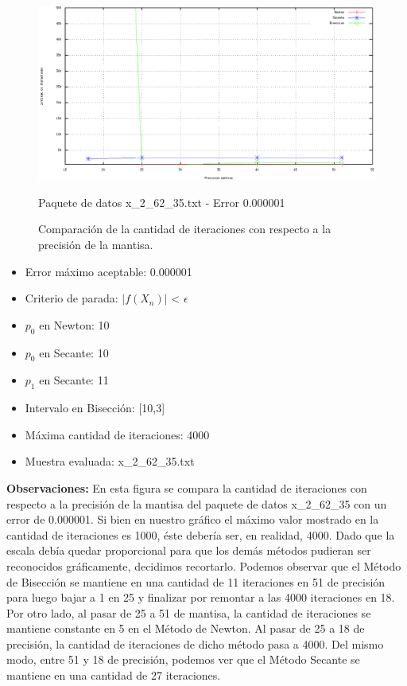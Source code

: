 \documentclass[10pt, a4paper]{article}
\begin{document}
\begin{figure}[H] %
\begin{center}
\includegraphics[width=370pt]{./cantidaditeraciones_mantisaerror.png}
\caption[h]{Comparaci\'on de la cantidad de iteraciones con respecto a la precisi\'on de la mantisa.}{Paquete de datos x\_2\_62\_35.txt - Error 0.000001}
\end{center}
\end{figure}

\begin{itemize}
\item Error m\'aximo aceptable: 0.000001
\item Criterio de parada: $|f(X_{n})|$ < $\epsilon$ 
\item $p_{0}$ en Newton: 10
\item $p_{0}$ en Secante: 10
\item $p_{1}$ en Secante: 11
\item Intervalo en Bisecci\'on: [10,3]
\item M\'axima cantidad de iteraciones: 4000
\item Muestra evaluada: x\_2\_62\_35.txt
\end{itemize}

\large{\textbf{Observaciones:}}
En esta figura se compara la cantidad de iteraciones con respecto a la precisi\'on de la mantisa del paquete de datos x\_2\_62\_35 con un error de 0.000001.\newline
Si bien en nuestro gr\'afico el m\'aximo valor mostrado en la cantidad de iteraciones es 1000, \'este deber\'ia ser, en realidad, 4000. Dado que la escala deb\'ia quedar proporcional para que los dem\'as m\'etodos pudieran ser reconocidos gr\'aficamente, decidimos recortarlo. Podemos observar que el M\'etodo de Bisecci\'on se mantiene en una cantidad de 11 iteraciones en 51 de precisi\'on para luego bajar a 1 en 25 y finalizar por remontar a las 4000 iteraciones en 18. Por otro lado, al pasar de 25 a 51 de mantisa, la cantidad de iteraciones se mantiene constante en 5 en el M\'etodo de Newton. Al pasar de 25 a 18 de precisi\'on, la cantidad de iteraciones de dicho m\'etodo pasa a 4000. Del mismo modo, entre 51 y 18 de precisi\'on, podemos ver que el M\'etodo Secante se mantiene en una cantidad de 27 iteraciones.
\end{document}

